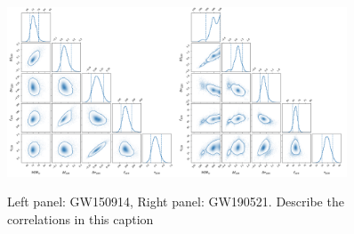 \begin{figure}
\begin{center}
        \includegraphics[width=0.45\textwidth]{figures/mtotal_qnm_params_degeneracy_GW150914.pdf}\includegraphics[width=0.45\textwidth]{figures/mtotal_qnm_params_degeneracy_S190521g.pdf}
        \caption{Left panel: GW150914, Right panel: GW190521. Describe the correlations in this caption}
        \label{fig:correlations}
\end{center}
\end{figure}
